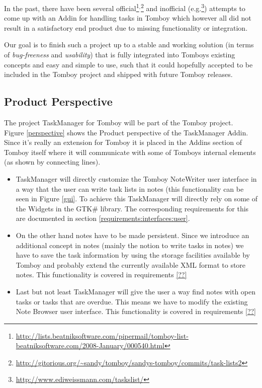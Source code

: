 
\label{integration}
In the past, there have been several official\footnote{\url{http://lists.beatniksoftware.com/pipermail/tomboy-list-beatniksoftware.com/2008-January/000540.html}}$^,$\footnote{\url{http://gitorious.org/~sandy/tomboy/sandys-tomboy/commits/task-lists2}} and inofficial (e.g.\footnote{\url{http://www.ediweissmann.com/taskslist/}}) attempts to come up with an Addin for handling tasks in Tomboy which however all did not result in a satisfactory end product due to missing functionality or integration.

Our goal is to finish such a project up to a stable and working solution (in terms of \textit{bug-freeness} and \textit{usability}) that is fully integrated into Tomboys existing concepts and easy and simple to use, such that it could hopefully accepted to be included in the Tomboy project and shipped with future Tomboy releases.

\subsection{Product Perspective}
\label{description:perspective}
  The project TaskManager for Tomboy will be part of the Tomboy project.\\
  Figure \ref{perspective} shows the Product perspective of the TaskManager Addin. Since it's really an extension for Tomboy it is placed in
  the Addins section of Tomboy itself where it will communicate with some of Tomboys internal elements (as shown by connecting lines).
  \begin{itemize}
    \item TaskManager will directly customize the Tomboy NoteWriter user interface in a way that the user can write task lists in notes 
	(this functionality can be seen in Figure \ref{gui}. To achieve this TaskManager will  directly rely on some of the 
	Widgets in the GTK\# library. The corresponding requirements for this are documented in section \ref{requirements:interfaces:user}.
    \item On the other hand notes have to be made persistent. Since we introduce an additional concept in notes (mainly
    the notion to write tasks in notes) we have to save the task information by using the storage facilities available by Tomboy and probably extend
    the currently available XML format to store notes. This functionality is covered in requirements \ref{??}%
    \item Last but not least TaskManager will give the user a way find notes with open tasks or tasks that are overdue. This means we have to modify
    the existing Note Browser user interface. This functionality is covered in requirements \ref{??}%
  \end{itemize}


